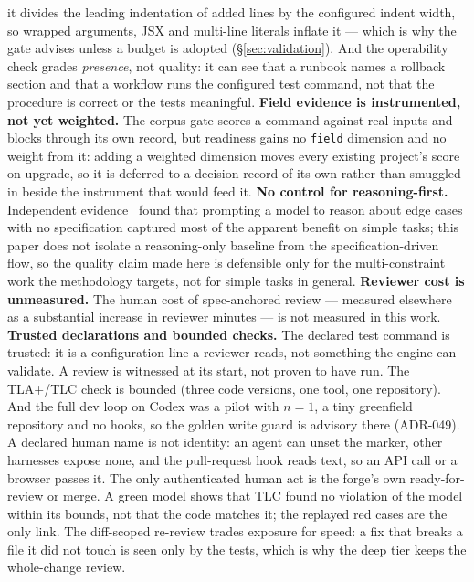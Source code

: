 \documentclass[11pt]{article}
\begin{document}
it divides the leading indentation of added lines by the configured indent width,
so wrapped arguments, JSX and multi-line literals inflate it --- which is why the
gate advises unless a budget is adopted (\S\ref{sec:validation}). And the
operability check grades \emph{presence}, not quality: it can see that a runbook
names a rollback section and that a workflow runs the configured test command, not
that the procedure is correct or the tests meaningful.
\textbf{Field evidence is instrumented, not yet weighted.} The corpus gate scores a
command against real inputs and blocks through its own record, but readiness gains
no \texttt{field} dimension and no weight from it: adding a weighted dimension
moves every existing project's score on upgrade, so it is deferred to a decision
record of its own rather than smuggled in beside the instrument that would feed
it.
\textbf{No control for reasoning-first.} Independent evidence~\cite{garg2026spec}
found that prompting a model to reason about edge cases with no specification
captured most of the apparent benefit on simple tasks; this paper does not
isolate a reasoning-only baseline from the specification-driven flow, so the
quality claim made here is defensible only for the multi-constraint work the
methodology targets, not for simple tasks in general.
\textbf{Reviewer cost is unmeasured.} The human cost of spec-anchored review
--- measured elsewhere~\cite{garg2026spec} as a substantial increase in
reviewer minutes --- is not measured in this work.
\textbf{Trusted declarations and bounded checks.} The declared test command is
trusted: it is a configuration line a reviewer reads, not something the engine
can validate. A review is witnessed at its start, not proven to have run. The
TLA+/TLC check is bounded (three code versions, one tool, one repository). And
the full dev loop on Codex was a pilot with $n=1$, a tiny greenfield repository
and no hooks, so the golden write guard is advisory there (ADR-049). A declared human name is not identity: an agent can unset the marker, other
harnesses expose none, and the pull-request hook reads text, so an API call or a
browser passes it. The only authenticated human act is the forge's own
ready-for-review or merge. A green model shows that TLC found no violation of the model within its
bounds, not that the code matches it; the replayed red cases are the only link. The diff-scoped re-review trades exposure for speed: a fix that breaks a
file it did not touch is seen only by the tests, which is why the deep tier
keeps the whole-change review.
\end{document}
